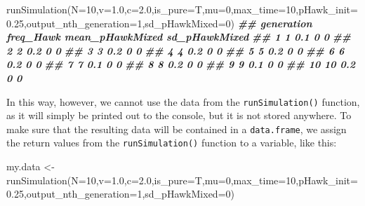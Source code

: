 \documentclass[
]{book}
\newenvironment{Shaded}{\begin{snugshade}}{\end{snugshade}}
\newcommand{\AttributeTok}[1]{\textcolor[rgb]{0.77,0.63,0.00}{#1}}
\newcommand{\DecValTok}[1]{\textcolor[rgb]{0.00,0.00,0.81}{#1}}
\newcommand{\DocumentationTok}[1]{\textcolor[rgb]{0.56,0.35,0.01}{\textbf{\textit{#1}}}}
\newcommand{\FloatTok}[1]{\textcolor[rgb]{0.00,0.00,0.81}{#1}}
\newcommand{\FunctionTok}[1]{\textcolor[rgb]{0.00,0.00,0.00}{#1}}
\newcommand{\NormalTok}[1]{#1}
\newcommand{\OtherTok}[1]{\textcolor[rgb]{0.56,0.35,0.01}{#1}}
\begin{document}
\begin{Shaded}
\begin{Highlighting}[]
\FunctionTok{runSimulation}\NormalTok{(}\AttributeTok{N=}\DecValTok{10}\NormalTok{,}\AttributeTok{v=}\FloatTok{1.0}\NormalTok{,}\AttributeTok{c=}\FloatTok{2.0}\NormalTok{,}\AttributeTok{is\_pure=}\NormalTok{T,}\AttributeTok{mu=}\DecValTok{0}\NormalTok{,}\AttributeTok{max\_time=}\DecValTok{10}\NormalTok{,}\AttributeTok{pHawk\_init=}\FloatTok{0.25}\NormalTok{,}\AttributeTok{output\_nth\_generation=}\DecValTok{1}\NormalTok{,}\AttributeTok{sd\_pHawkMixed=}\DecValTok{0}\NormalTok{)}
\DocumentationTok{\#\#    generation freq\_Hawk mean\_pHawkMixed sd\_pHawkMixed}
\DocumentationTok{\#\# 1           1       0.1               0             0}
\DocumentationTok{\#\# 2           2       0.2               0             0}
\DocumentationTok{\#\# 3           3       0.2               0             0}
\DocumentationTok{\#\# 4           4       0.2               0             0}
\DocumentationTok{\#\# 5           5       0.2               0             0}
\DocumentationTok{\#\# 6           6       0.2               0             0}
\DocumentationTok{\#\# 7           7       0.1               0             0}
\DocumentationTok{\#\# 8           8       0.2               0             0}
\DocumentationTok{\#\# 9           9       0.1               0             0}
\DocumentationTok{\#\# 10         10       0.2               0             0}
\end{Highlighting}
\end{Shaded}

In this way, however, we cannot use the data from the \texttt{runSimulation()} function, as it will simply be printed out to the console, but it is not stored anywhere. To make sure that the resulting data will be contained in a \texttt{data.frame}, we assign the return values from the \texttt{runSimulation()} function to a variable, like this:

\begin{Shaded}
\begin{Highlighting}[]
\NormalTok{my.data }\OtherTok{\textless{}{-}} \FunctionTok{runSimulation}\NormalTok{(}\AttributeTok{N=}\DecValTok{10}\NormalTok{,}\AttributeTok{v=}\FloatTok{1.0}\NormalTok{,}\AttributeTok{c=}\FloatTok{2.0}\NormalTok{,}\AttributeTok{is\_pure=}\NormalTok{T,}\AttributeTok{mu=}\DecValTok{0}\NormalTok{,}\AttributeTok{max\_time=}\DecValTok{10}\NormalTok{,}\AttributeTok{pHawk\_init=}\FloatTok{0.25}\NormalTok{,}\AttributeTok{output\_nth\_generation=}\DecValTok{1}\NormalTok{,}\AttributeTok{sd\_pHawkMixed=}\DecValTok{0}\NormalTok{)}
\end{Highlighting}
\end{Shaded}
\end{document}
